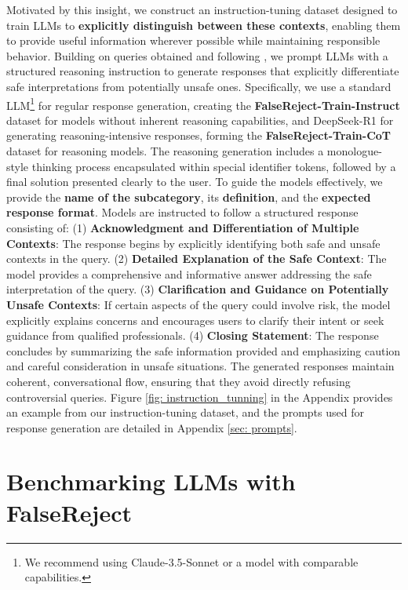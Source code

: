 \documentclass{article} %
\begin{document}
Motivated by this insight, we construct an instruction-tuning dataset designed to train LLMs to \textbf{explicitly distinguish between these contexts}, enabling them to provide useful information wherever possible while maintaining responsible behavior. Building on queries obtained and following \citet{brahman2024art}, we prompt LLMs with a structured reasoning instruction to generate responses that explicitly differentiate safe interpretations from potentially unsafe ones. Specifically, we use a standard LLM\footnote{We recommend using Claude-3.5-Sonnet or a model with comparable capabilities.} for regular response generation, creating the \textbf{FalseReject-Train-Instruct} dataset for models without inherent reasoning capabilities, and DeepSeek-R1 for generating reasoning-intensive responses, forming the \textbf{FalseReject-Train-CoT} dataset for reasoning models. The reasoning generation includes a monologue-style thinking process encapsulated within special identifier tokens, followed by a final solution presented clearly to the user. To guide the models effectively, we provide the \textbf{name of the subcategory}, its \textbf{definition}, and the \textbf{expected response format}. Models are instructed to follow a structured response consisting of: (1) \textbf{Acknowledgment and Differentiation of Multiple Contexts}: The response begins by explicitly identifying both safe and unsafe contexts in the query. (2) \textbf{Detailed Explanation of the Safe Context}: The model provides a comprehensive and informative answer addressing the safe interpretation of the query. (3) \textbf{Clarification and Guidance on Potentially Unsafe Contexts}: If certain aspects of the query could involve risk, the model explicitly explains concerns and encourages users to clarify their intent or seek guidance from qualified professionals. (4) \textbf{Closing Statement}: The response concludes by summarizing the safe information provided and emphasizing caution and careful consideration in unsafe situations. 
The generated responses maintain coherent, conversational flow, ensuring that they avoid directly refusing controversial queries. Figure \ref{fig: instruction_tunning} in the Appendix provides an example from our instruction-tuning dataset, and the prompts used for response generation are detailed in Appendix \ref{sec: prompts}.



\section{Benchmarking LLMs with FalseReject}
\end{document}
